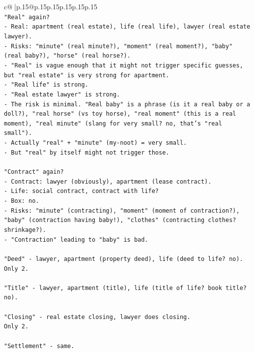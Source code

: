 \documentclass{article}
\begin{document}
{\begin{supertabular}{c@{$\;$}|p{.15\linewidth}@{}p{.15\linewidth}p{.15\linewidth}p{.15\linewidth}p{.15\linewidth}p{.15\linewidth}}
{{{\\ 
\texttt{"Real" again?} \\
\texttt{{-} Real: apartment (real estate), life (real life), lawyer (real estate lawyer).} \\
\texttt{{-} Risks: "minute" (real minute?), "moment" (real moment?), "baby" (real baby?), "horse" (real horse?).} \\
\texttt{{-} "Real" is vague enough that it might not trigger specific guesses, but "real estate" is very strong for apartment.} \\
\texttt{{-} "Real life" is strong.} \\
\texttt{{-} "Real estate lawyer" is strong.} \\
\texttt{{-} The risk is minimal. "Real baby" is a phrase (is it a real baby or a doll?), "real horse" (vs toy horse), "real moment" (this is a real moment), "real minute" (slang for very small? no, that's "real small").} \\
\texttt{{-} Actually "real" + "minute" (my{-}noot) = very small.} \\
\texttt{{-} But "real" by itself might not trigger those.} \\
\\ 
\texttt{"Contract" again?} \\
\texttt{{-} Contract: lawyer (obviously), apartment (lease contract).} \\
\texttt{{-} Life: social contract, contract with life?} \\
\texttt{{-} Box: no.} \\
\texttt{{-} Risks: "minute" (contracting), "moment" (moment of contraction?), "baby" (contraction having baby!), "clothes" (contracting clothes? shrinkage?).} \\
\texttt{{-} "Contraction" leading to "baby" is bad.} \\
\\ 
\texttt{"Deed" {-} lawyer, apartment (property deed), life (deed to life? no).} \\
\texttt{Only 2.} \\
\\ 
\texttt{"Title" {-} lawyer, apartment (title), life (title of life? book title? no).} \\
\\ 
\texttt{"Closing" {-} real estate closing, lawyer does closing.} \\
\texttt{Only 2.} \\
\\ 
\texttt{"Settlement" {-} same.} \\
}}}
\end{supertabular}}
\end{document}
